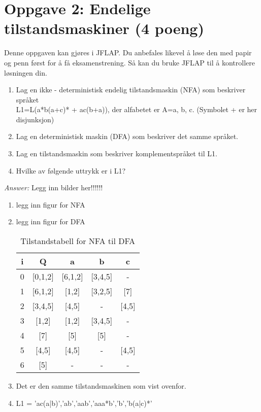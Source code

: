 \documentclass[a4paper, 12pt,]{article}             %
\begin{document}
\section*{Oppgave 2: Endelige tilstandsmaskiner (4 poeng)}
Denne oppgaven kan gjøres i JFLAP. Du anbefales likevel å løse den med papir og penn først for å få 
eksamenstrening. Så kan du bruke JFLAP til å kontrollere løsningen din.
\begin{enumerate}
  \item Lag en ikke - deterministisk endelig tilstandsmaskin (NFA) som beskriver språket\\  
    L1=L(a*b(a+c)* + ac(b+a)), der alfabetet er A={a, b, c}. (Symbolet + er her disjunksjon)
  \item Lag en deterministisk maskin (DFA) som beskriver det samme språket. 
  \item Lag en tilstandsmaskin som beskriver komplementspråket til L1. 
  \item Hvilke av følgende uttrykk er i L1?
  \end{enumerate}
   
  \clearpage

  \textit{Answer:}
Legg inn bilder her!!!!!!
  \begin{enumerate}
  \item  legg inn figur for NFA
  \item  legg inn figur for DFA
\begin{table}[H]
\centering
  \begin{tabular}{c|c|c c c}
    i & Q & a  & b  & c \\ \hline
    0 & [0,1,2] & [6,1,2] & [3,4,5] & -       \\ 
    1 & [6,1,2] & [1,2]   & [3,2,5] & [7]     \\ 
    2 & [3,4,5] & [4,5]   & -       & [4,5]   \\
    3 & [1,2]   & [1,2]   & [3,4,5] & -       \\
    4 & [7]     & [5]     & [5]     & -       \\
    5 & [4,5]   & [4,5]   & -       & [4,5]   \\
    6 & [5]     & -       & -       & -       \\
  \end{tabular}
  \caption{Tilstandstabell for NFA til DFA}
  \label{tab:my_label}
\end{table}

\item Det er den samme tilstandsmaskinen som vist ovenfor.
\item L1 = {'ac(a|b)','ab','aab','aaa*b','b','b(a|c)*'}
\end{enumerate}
  
\end{document}
